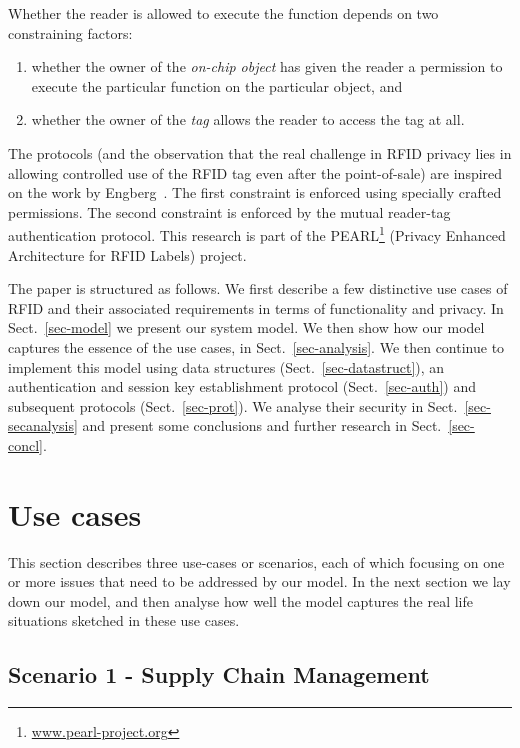 Whether the reader is allowed to execute the function
depends on two constraining factors:
\begin{enumerate}
\item whether the owner of the \emph{on-chip object} has
given the reader a permission to execute the particular 
function on the particular object, and 
\item whether the owner of the \emph{tag} allows
the reader to access the tag at all.
\end{enumerate}
The protocols (and the observation that the real challenge in RFID privacy lies
in allowing controlled use of the RFID tag even after the point-of-sale)
are inspired on the work by Engberg~\cite{engberg2004zeroknowledge-rfid}.
The first constraint is enforced using specially crafted permissions. 
The second constraint is enforced by the mutual reader-tag authentication
protocol. 
This research is part of the PEARL\footnote{\url{www.pearl-project.org}
}
(Privacy Enhanced Architecture for RFID Labels) project.

The paper is structured as follows. We first describe a few distinctive use
cases of RFID and their associated requirements in terms of functionality and
privacy. In Sect.~\ref{sec-model} we present our system model. We then
show how our model captures the essence of the use cases, in
Sect.~\ref{sec-analysis}. We then continue to implement this model using
data structures (Sect.~\ref{sec-datastruct}), an authentication and session
key establishment protocol (Sect.~\ref{sec-auth}) and subsequent
protocols (Sect.~\ref{sec-prot}). We analyse their security in
Sect.~\ref{sec-secanalysis} and present some conclusions and further research
in Sect.~\ref{sec-concl}.


\section{Use cases}
\label{sec-usecases}

This section describes three use-cases or scenarios, each of which focusing on
one or more issues that need to be addressed by our model. In the next section
we lay down our model, and then analyse how well the model captures the real
life situations sketched in these use cases.

\subsection{Scenario 1 - Supply Chain Management}

